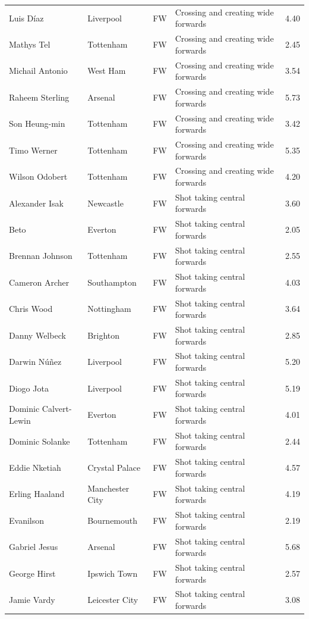 \begin{longtable}{p{3.4cm}p{2.5cm}p{1.0cm}p{5.0cm}r}
Luis Díaz & Liverpool & FW & Crossing and creating wide forwards & 4.40 \\
Mathys Tel & Tottenham & FW & Crossing and creating wide forwards & 2.45 \\
Michail Antonio & West Ham & FW & Crossing and creating wide forwards & 3.54 \\
Raheem Sterling & Arsenal & FW & Crossing and creating wide forwards & 5.73 \\
Son Heung-min & Tottenham & FW & Crossing and creating wide forwards & 3.42 \\
Timo Werner & Tottenham & FW & Crossing and creating wide forwards & 5.35 \\
Wilson Odobert & Tottenham & FW & Crossing and creating wide forwards & 4.20 \\
Alexander Isak & Newcastle & FW & Shot taking central forwards & 3.60 \\
Beto & Everton & FW & Shot taking central forwards & 2.05 \\
Brennan Johnson & Tottenham & FW & Shot taking central forwards & 2.55 \\
Cameron Archer & Southampton & FW & Shot taking central forwards & 4.03 \\
Chris Wood & Nottingham & FW & Shot taking central forwards & 3.64 \\
Danny Welbeck & Brighton & FW & Shot taking central forwards & 2.85 \\
Darwin Núñez & Liverpool & FW & Shot taking central forwards & 5.20 \\
Diogo Jota & Liverpool & FW & Shot taking central forwards & 5.19 \\
Dominic Calvert-Lewin & Everton & FW & Shot taking central forwards & 4.01 \\
Dominic Solanke & Tottenham & FW & Shot taking central forwards & 2.44 \\
Eddie Nketiah & Crystal Palace & FW & Shot taking central forwards & 4.57 \\
Erling Haaland & Manchester City & FW & Shot taking central forwards & 4.19 \\
Evanilson & Bournemouth & FW & Shot taking central forwards & 2.19 \\
Gabriel Jesus & Arsenal & FW & Shot taking central forwards & 5.68 \\
George Hirst & Ipswich Town & FW & Shot taking central forwards & 2.57 \\
Jamie Vardy & Leicester City & FW & Shot taking central forwards & 3.08 \\

\end{longtable}
